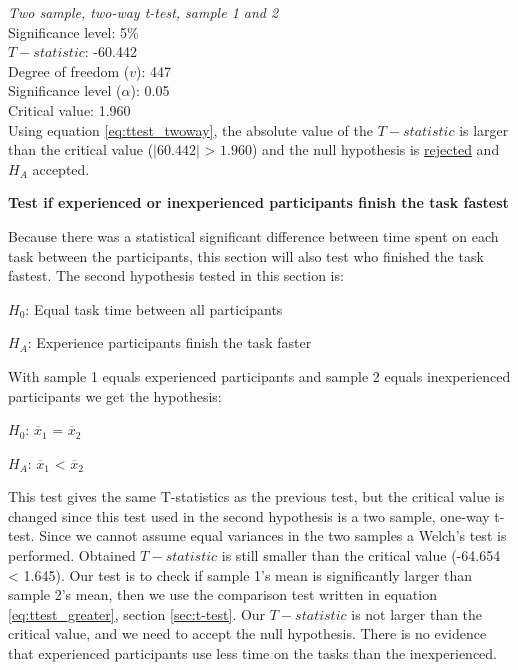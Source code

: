  \begin{center}
	\begin{tcolorbox}[width=0.8\textwidth]
		\centering
		\textit{Two sample, two-way t-test, sample 1 and 2}\\
		Significance level: 5\%  \\[0.5cm]
		
		$T-statistic$: -60.442 \\
		Degree of freedom ($v$): 447 \\ %
		Significance level ($\alpha$): 0.05 \\
		Critical value: 1.960\\[0.2cm]
		
		Using equation \ref{eq:ttest_twoway}, the absolute value of the $T-statistic$ is larger than the critical value ($|60.442|$ > $1.960$) and the null hypothesis is \underline{rejected} and $H_A$ accepted.\\[0.5cm]

	\end{tcolorbox} 
\end{center}

\vspace{0.5cm}

\textbf{Test if experienced or inexperienced participants finish the task fastest} 

Because there was a statistical significant difference between time spent on each task between the participants, this section will also test who finished the task fastest. The second hypothesis tested in this section is:\newline

\centerline{$H_{0}$: Equal task time between all participants}
\centerline{$H_{A}$: Experience participants finish the task faster}

With sample 1 equals experienced participants and sample 2 equals inexperienced participants we get the hypothesis:\\[0.2cm]

\centerline{$H_{0}$: $\overline{x}_1$ = $\overline{x}_2$}
\centerline{$H_{A}$: $\overline{x}_1$ < $\overline{x}_2$}

This test gives the same T-statistics as the previous test, but the critical value is changed since this test used in the second hypothesis is a two sample, one-way t-test. Since we cannot assume equal variances in the two samples a Welch's test is performed. Obtained $T-statistic$ is still smaller than the critical value (-64.654 < 1.645). Our test is to check if sample 1's mean is significantly larger than sample 2's mean, then we use the comparison test written in equation \ref{eq:ttest_greater}, section \ref{sec:t-test}. Our $T-statistic$ is not larger than the critical value, and we need to accept the null hypothesis. There is no evidence that experienced participants use less time on the tasks than the inexperienced. \\[0.2cm]

